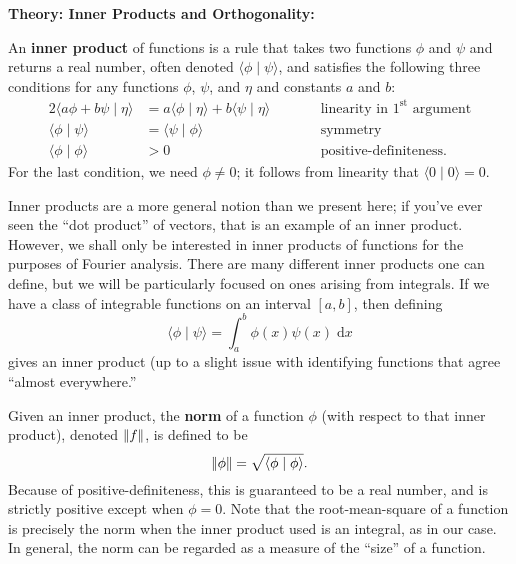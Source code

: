 \documentclass{article}
\newcommand{\diff}{\;\mathrm{d}}
\newcommand{\norm}[1]{\left|\kern-1pt\left|#1\right|\kern-1pt\right|}
\begin{document}
\clearpage










\textbf{Theory: Inner Products and Orthogonality:}

\bigskip



An \textbf{inner product} of functions is a rule that takes two functions $\phi$ and $\psi$ and returns a real number, often denoted $\langle \phi\mid \psi\rangle$, and satisfies the following three conditions for any functions $\phi$, $\psi$, and $\eta$ and constants $a$ and $b$:
\begin{alignat*}{2}
	\langle a\phi+b\psi\mid \eta\rangle &= a\langle \phi\mid \eta \rangle + b\langle \psi\mid \eta\rangle\qquad&& \mbox{linearity in $1^\mathrm{st}$ argument}\\
	\langle \phi\mid \psi\rangle &= \langle \psi\mid \phi\rangle\qquad&& \mbox{symmetry}\\
	\langle \phi\mid\phi\rangle &> 0\qquad&& \mbox{positive-definiteness.}
\end{alignat*}
For the last condition, we need $\phi\neq 0$; it follows from linearity that $\langle 0\mid 0\rangle = 0$.

Inner products are a more general notion than we present here; if you've ever seen the ``dot product'' of vectors, that is an example of an inner product. However, we shall only be interested in inner products of functions for the purposes of Fourier analysis. There are many different inner products one can define, but we will be particularly focused on ones arising from integrals. If we have a class of integrable functions on an interval $[a,b]$, then defining
\[\langle\phi\mid \psi\rangle = \int_a^b \phi(x)\psi(x)\diff x\]
gives an inner product (up to a slight issue with identifying functions that agree ``almost everywhere.''\medskip

Given an inner product, the \textbf{norm} of a function $\phi$ (with respect to that inner product), denoted $\norm{f}$, is defined to be
\[\norm{\phi}=\sqrt{\langle \phi\mid \phi\rangle}.\]
Because of positive-definiteness, this is guaranteed to be a real number, and is strictly positive except when $\phi=0$. Note that the root-mean-square of a function is precisely the norm when the inner product used is an integral, as in our case. In general, the norm can be regarded as a measure of the ``size'' of a function.\medskip
\end{document}
